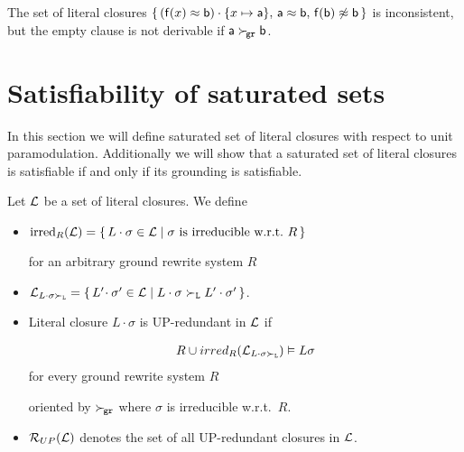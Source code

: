            \begin{example}
        The set of literal closures
       \( \{ \,
        (\mathsf{f}(x)\approx\mathsf{b})\cdot \{ x\mapsto\mathsf{a} \}, \,
       \mathsf{a}\approx \mathsf{b}, \,
       \mathsf{f}(\mathsf{b})\not\approx\mathsf{b} \,
       \} \) is inconsistent,
        but the empty clause is not derivable
        if \( \mathsf{a}\mathrel\succ_{\!\mathtt{gr}}\mathsf{b} \).
           \end{example}

\section{Satisfiability of saturated sets}\label{sec:inst:saturated:sets}

In this section we will define saturated set of literal closures
with respect to unit paramodulation.
Additionally we will show that a saturated set of literal closures
is satisfiable if and only if its grounding is satisfiable.

   \begin{definition}[UP-Redundancy]
        Let \( \mathcal{L} \) be a set of literal closures. We define
       \begin{itemize}
           \item \( \operatorname{irred}_R(\mathcal{L}) =
           \{ \,
            L\cdot\sigma\in\mathcal{L} \mid
           \sigma\text{ is irreducible w.r.t.~}R
           \, \} \)

        for an arbitrary ground rewrite system \( R \)

       \item
       \(
       \mathcal{L}_{L\cdot\sigma\mathrel\succ_{\mathtt{L}}} =
       \{ \,
        L'\!\cdot\sigma'\in\mathcal{L} \mid
        L\cdot\sigma\mathrel\succ_{\mathtt{L}} L'\cdot\sigma'
       \, \}
         \).

       \item Literal closure \( L\cdot\sigma \) is UP-redundant in \( \mathcal{L} \) if

       \begin{gather*}
            R \cup irred_R(\mathcal{L}_{L\cdot\sigma\mathrel\succ_{\mathtt{L}}}) \vDash L\sigma
       \end{gather*}
        for every ground rewrite system \( R \)

        oriented by \( \mathrel\succ_{\!\mathtt{gr}} \)
        where \( \sigma \) is irreducible w.r.t.~\( R \).

       \item
       \( \mathcal{R}_{UP}(\mathcal{L}) \) denotes the set of all UP-redundant closures in \( \mathcal{L} \).
   \end{itemize}
\end{definition}

